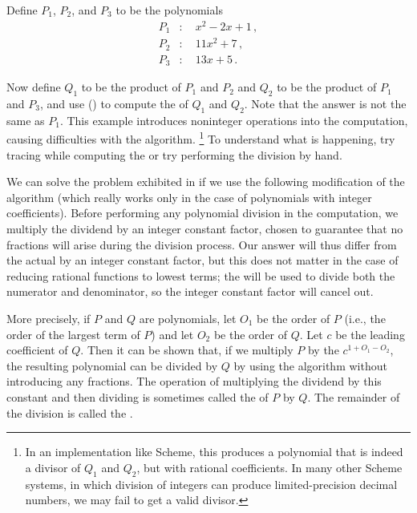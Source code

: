 \begin{exercise}
	\label{Exercise 2.95}
	Define \( P_1 \), \( P_2 \), and \( P_3 \) to be the polynomials
	\begin{align*}
		P_1 &: \quad x^2 - 2 x + 1 \,,  \\
		P_2 &: \quad 11 x^2 + 7 \,,     \\
		P_3 &: \quad 13 x + 5 \,.
	\end{align*}

	Now define \( Q_1 \) to be the product of \( P_1 \) and \( P_2 \) and \( Q_2 \) to be the product of \( P_1 \) and \( P_3 \), and use  () to compute the  of \( Q_1 \) and \( Q_2 \).
	Note that the answer is not the same as \( P_1 \).
	This example introduces noninteger operations into the computation, causing difficulties with the  algorithm.%
	\footnote{
		In an implementation like  Scheme, this produces a polynomial that is indeed a divisor of \( Q_1 \) and \( Q_2 \), but with rational coefficients.
		In many other Scheme systems, in which division of integers can produce limited-precision decimal numbers, we may fail to get a valid divisor.
	}
	To understand what is happening, try tracing  while computing the  or try performing the division by hand.
\end{exercise}

We can solve the problem exhibited in  if we use the following modification of the  algorithm (which really works only in the case of polynomials with integer coefficients).
Before performing any polynomial division in the  computation, we multiply the dividend by an integer constant factor, chosen to guarantee that no fractions will arise during the division process.
Our answer will thus differ from the actual  by an integer constant factor, but this does not matter in the case of reducing rational functions to lowest terms;
the  will be used to divide both the numerator and denominator, so the integer constant factor will cancel out.

More precisely, if \( P \) and \( Q \) are polynomials, let \( O_1 \) be the order of \( P \) (i.e., the order of the largest term of \( P \)) and let \( O_2 \) be the order of \( Q \).
Let \( c \) be the leading coefficient of \( Q \).
Then it can be shown that, if we multiply \( P \) by the  \( c^{1 + O_1 - O_2} \), the resulting polynomial can be divided by \( Q \) by using the  algorithm without introducing any fractions.
The operation of multiplying the dividend by this constant and then dividing is sometimes called the  of \( P \) by \( Q \).
The remainder of the division is called the .



